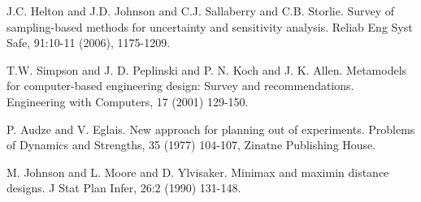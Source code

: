 
\begin{thebibliography}{10}

{\sc J.C. Helton and J.D. Johnson and C.J. Sallaberry and C.B. Storlie}. {Survey of sampling-based methods for   uncertainty and sensitivity analysis}. Reliab Eng Syst Safe,   91:10-11 (2006), 1175-1209.



{\sc  T.W. Simpson and J. D. Peplinski and P. N. Koch and J. K. Allen}. {Metamodels for computer-based engineering design:   Survey and recommendations}. Engineering with Computers, 17 (2001) 129-150.



{\sc P. Audze and V. Eglais}. {New approach for planning   out of experiments}. Problems of Dynamics and Strengths, 35 (1977) 104-107, Zinatne Publishing House.



{\sc  M. Johnson and L. Moore and D. Ylvisaker}. {Minimax and maximin distance designs}. J Stat Plan Infer, 26:2 (1990) 131-148.

\end{thebibliography}
